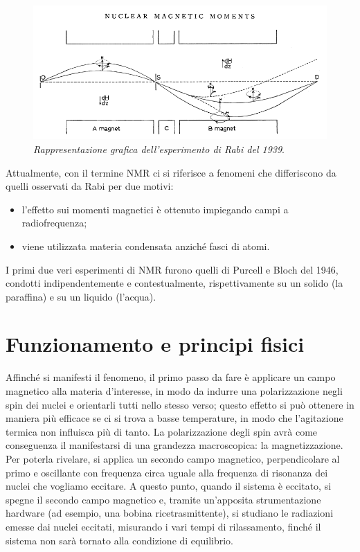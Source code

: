 \documentclass{report}
\numberwithin{equation}{section}
\numberwithin{figure}{section}
\begin{document}
\begin{figure}[htp]
    \centering
    \includegraphics[scale=0.6]{immagini/rabi.png}
    \caption{\textit{Rappresentazione grafica dell'esperimento di Rabi del 1939}.}
    \label{fig:rabi}
\end{figure}

Attualmente, con il termine NMR ci si riferisce a fenomeni che differiscono da quelli osservati da Rabi per due motivi:
\begin{itemize}[label=$-$]
    \item l'effetto sui momenti magnetici è ottenuto impiegando campi a radiofrequenza;
    \item viene utilizzata materia condensata anziché fasci di atomi.
\end{itemize}
I primi due veri esperimenti di NMR furono quelli di Purcell e Bloch del 1946, condotti indipendentemente e contestualmente, rispettivamente su un solido (la paraffina) e su un liquido (l'acqua).

\section{Funzionamento e principi fisici}
Affinché si manifesti il fenomeno, il primo passo da fare è applicare un campo magnetico alla materia d'interesse, in modo da indurre una polarizzazione negli spin dei nuclei e orientarli tutti nello stesso verso; questo effetto si può ottenere in maniera più efficace se ci si trova a basse temperature, in modo che l'agitazione termica non influisca più di tanto. La polarizzazione degli spin avrà come conseguenza il manifestarsi di una grandezza macroscopica: la magnetizzazione. Per poterla rivelare, si applica un secondo campo magnetico, perpendicolare al primo e oscillante con frequenza circa uguale alla frequenza di risonanza dei nuclei che vogliamo eccitare. A questo punto, quando il sistema è eccitato, si spegne il secondo campo magnetico e, tramite un'apposita strumentazione hardware (ad esempio, una bobina ricetrasmittente), si studiano le radiazioni emesse dai nuclei eccitati, misurando i vari tempi di rilassamento, finché il sistema non sarà tornato alla condizione di equilibrio.
\end{document}
